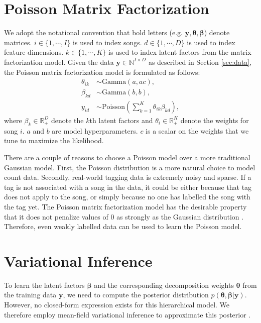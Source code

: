 \section{Poisson Matrix Factorization}\label{sec:pmf}
We adopt the notational convention that bold letters (e.g. $\boldsymbol{y}, \boldsymbol{\theta}, \boldsymbol{\beta}$) denote matrices. $i \in \{1, \cdots, I\}$ is used to index songs. $d \in \{1, \cdots, D\}$ is used to index feature dimensions. $k \in \{1, \cdots, K\}$ is used to index latent factors from the matrix factorization model. Given the data $\boldsymbol{y}\in \mathbb{N}^{I\times D}$ as described in Section \ref{sec:data}, the Poisson matrix factorization model is formulated as follows:
\begin{equation} \label{eq:model} 
\begin{split}
\theta_{ik} &\sim \text{Gamma}(a, ac),\\
\beta_{kd} &\sim \text{Gamma}(b, b),\\
y_{id} &\sim \text{Poisson}( \textstyle\sum_{k=1}^K \theta_{ik} \beta_{kd}),
\end{split}
\end{equation}
where $\beta_k \in \mathbb{R}_+^{D}$ denote the $k$th latent factors and $\theta_i \in \mathbb{R}_{+}^{K}$ denote the weights for song $i$. $a$ and $b$ are model hyperparameters. $c$ is a scalar on the weights that we tune to maximize the likelihood. 

There are a couple of reasons to choose a Poisson model over a more traditional Gaussian model\cite{salakhutdinov2007probabilistic}. First, the Poisson distribution is a more natural choice to model count data. Secondly, real-world tagging data is extremely noisy and sparse. If a tag is not associated with a song in the data, it could be either because that tag does not apply to the song, or simply because no one has labelled the song with the tag yet. The Poisson matrix factorization model has the desirable property that it does not penalize values of $0$ as strongly as the Gaussian distribution \cite{paisley2015handbook}. Therefore, even weakly labelled data can be used to learn the Poisson model.  

\section{Variational Inference}\label{sec:inference}

To learn the latent factors $\boldsymbol{\beta}$ and the corresponding decomposition weights $\boldsymbol{\theta}$ from the training data $\boldsymbol{y}$, we need to compute the posterior distribution $p(\boldsymbol{\theta}, \boldsymbol{\beta} | \boldsymbol{y})$. However, no closed-form expression exists for this hierarchical model. We therefore employ mean-field variational inference to approximate this posterior \cite{jordan1999introduction}.

